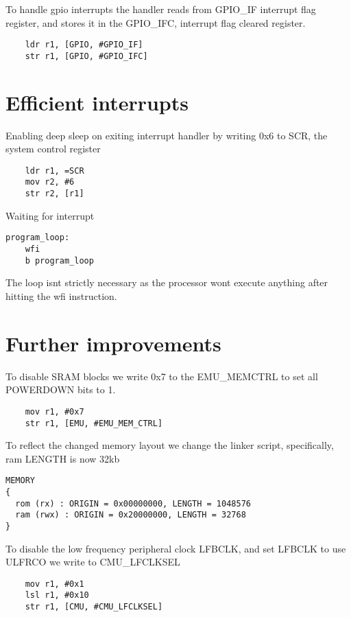 To handle gpio interrupts the handler reads from GPIO\_IF interrupt flag register, and stores it in the GPIO\_IFC, interrupt flag cleared register.

\begin{lstlisting}
	ldr r1, [GPIO, #GPIO_IF]	
	str r1, [GPIO, #GPIO_IFC]	
\end{lstlisting}


\section{Efficient interrupts}

Enabling deep sleep on exiting interrupt handler by writing 0x6 to SCR, the system control register 

\begin{lstlisting}
	ldr r1, =SCR
	mov r2, #6
	str r2, [r1]	
\end{lstlisting}

Waiting for interrupt

\begin{lstlisting}
program_loop:
 	wfi
	b program_loop  	
\end{lstlisting}

The loop isnt strictly necessary as the processor wont execute anything after hitting the wfi instruction.

\section{Further improvements}

To disable SRAM blocks we write 0x7 to the EMU\_MEMCTRL to set all POWERDOWN bits to 1.

\begin{lstlisting}
	mov r1, #0x7
	str r1, [EMU, #EMU_MEM_CTRL]
\end{lstlisting}

To reflect the changed memory layout we change the linker script, specifically, ram LENGTH is now 32kb

\begin{lstlisting}
MEMORY
{
  rom (rx) : ORIGIN = 0x00000000, LENGTH = 1048576
  ram (rwx) : ORIGIN = 0x20000000, LENGTH = 32768
}
\end{lstlisting}

To disable the low frequency peripheral clock LFBCLK, and set LFBCLK to use ULFRCO we write to CMU\_LFCLKSEL

\begin{lstlisting}
	mov r1, #0x1
	lsl r1, #0x10
	str r1, [CMU, #CMU_LFCLKSEL]
\end{lstlisting}

